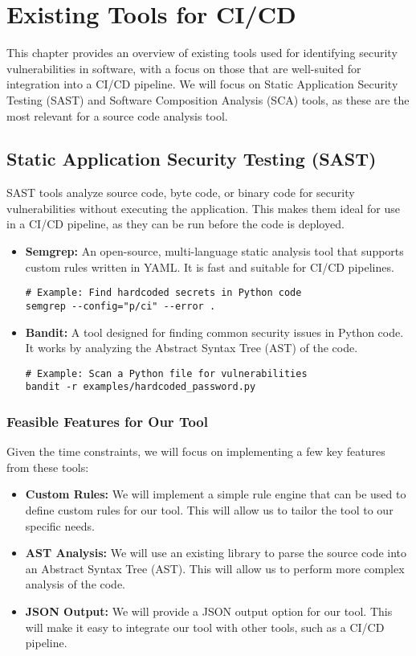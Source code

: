 \chapter{Existing Tools for CI/CD}
\label{chap:tools}
\setlength{\parskip}{1em}

This chapter provides an overview of existing tools used for identifying security vulnerabilities in software, with a focus on those that are well-suited for integration into a CI/CD pipeline. We will focus on Static Application Security Testing (SAST) and Software Composition Analysis (SCA) tools, as these are the most relevant for a source code analysis tool.

\section{Static Application Security Testing (SAST)}
SAST tools analyze source code, byte code, or binary code for security vulnerabilities without executing the application. This makes them ideal for use in a CI/CD pipeline, as they can be run before the code is deployed.

\begin{itemize}
    \item \textbf{Semgrep:} An open-source, multi-language static analysis tool that supports custom rules written in YAML. It is fast and suitable for CI/CD pipelines.
    \begin{verbatim}
# Example: Find hardcoded secrets in Python code
semgrep --config="p/ci" --error .
    \end{verbatim}
    \item \textbf{Bandit:} A tool designed for finding common security issues in Python code. It works by analyzing the Abstract Syntax Tree (AST) of the code.
    \begin{verbatim}
# Example: Scan a Python file for vulnerabilities
bandit -r examples/hardcoded_password.py
    \end{verbatim}
\end{itemize}

\subsection{Feasible Features for Our Tool}
Given the time constraints, we will focus on implementing a few key features from these tools:
\begin{itemize}
    \item \textbf{Custom Rules:} We will implement a simple rule engine that can be used to define custom rules for our tool. This will allow us to tailor the tool to our specific needs.
    \item \textbf{AST Analysis:} We will use an existing library to parse the source code into an Abstract Syntax Tree (AST). This will allow us to perform more complex analysis of the code.
    \item \textbf{JSON Output:} We will provide a JSON output option for our tool. This will make it easy to integrate our tool with other tools, such as a CI/CD pipeline.
\end{itemize}

